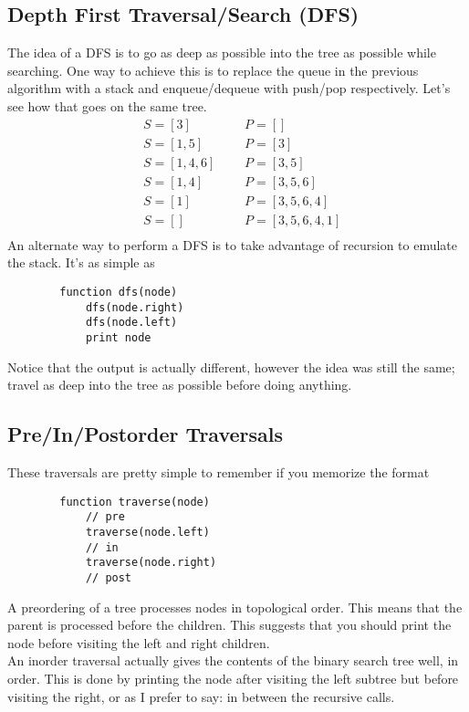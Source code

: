 \documentclass[11pt]{book}
\begin{document}
	\subsection{Depth First Traversal/Search (DFS)}
		The idea of a DFS is to go as deep as possible into the tree as possible
		while searching. One way to achieve this is to replace the queue in the
		previous algorithm with a stack and enqueue/dequeue with push/pop respectively.
		Let's see how that goes on the same tree.
		\begin{align}
			& S = [3] & \text{    } & P = [] \\
			& S = [1,5] & \text{    } & P = [3] \\
			& S = [1,4,6] & \text{    } & P = [3,5] \\
			& S = [1,4] & \text{    } & P = [3,5,6] \\
			& S = [1] & \text{    } & P = [3,5,6,4] \\
			& S = [] & \text{    } & P = [3,5,6,4,1] \\
		\end{align}
		An alternate way to perform a DFS is to take advantage of recursion to
		emulate the stack. It's as simple as
		\begin{verbatim}
		function dfs(node)
		    dfs(node.right)
		    dfs(node.left)
		    print node
		\end{verbatim}
		Notice that the output is actually different, however the idea was still the
		same; travel as deep into the tree as possible before doing anything.

	\subsection{Pre/In/Postorder Traversals}
		These traversals are pretty simple to remember if you memorize the format
		\begin{verbatim}
		function traverse(node)
		    // pre
		    traverse(node.left)
		    // in
		    traverse(node.right)
		    // post
		\end{verbatim}
		A preordering of a tree processes nodes in topological order. This means
		that the parent is processed before the children. This suggests that you
		should print the node before visiting the left and right children. \\

		\noindent An inorder traversal actually gives the contents of the binary search
		tree well, in order. This is done by printing the node after visiting the left
		subtree but before visiting the right, or as I prefer to say: in between the
		recursive calls. \\
\end{document}
